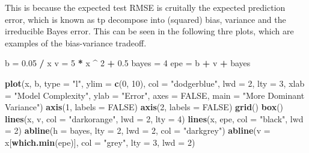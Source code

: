 \documentclass[]{report}
\newenvironment{Shaded}{\begin{snugshade}}{\end{snugshade}}
\newcommand{\KeywordTok}[1]{\textcolor[rgb]{0.13,0.29,0.53}{\textbf{#1}}}
\newcommand{\DataTypeTok}[1]{\textcolor[rgb]{0.13,0.29,0.53}{#1}}
\newcommand{\DecValTok}[1]{\textcolor[rgb]{0.00,0.00,0.81}{#1}}
\newcommand{\FloatTok}[1]{\textcolor[rgb]{0.00,0.00,0.81}{#1}}
\newcommand{\StringTok}[1]{\textcolor[rgb]{0.31,0.60,0.02}{#1}}
\newcommand{\OtherTok}[1]{\textcolor[rgb]{0.56,0.35,0.01}{#1}}
\newcommand{\OperatorTok}[1]{\textcolor[rgb]{0.81,0.36,0.00}{\textbf{#1}}}
\newcommand{\NormalTok}[1]{#1}
\begin{document}
This is because the expected test RMSE is cruitally the expected
prediction error, which is known as tp decompose into (squared) bias,
variance and the irreducible Bayes error. This can be seen in the
following thre plots, which are examples of the bias-variance tradeoff.

\begin{Shaded}
\begin{Highlighting}[]
\NormalTok{b =}\StringTok{ }\FloatTok{0.05} \OperatorTok{/}\StringTok{ }\NormalTok{x}
\NormalTok{v =}\StringTok{ }\DecValTok{5} \OperatorTok{*}\StringTok{ }\NormalTok{x }\OperatorTok{^}\StringTok{ }\DecValTok{2} \OperatorTok{+}\StringTok{ }\FloatTok{0.5}
\NormalTok{bayes =}\StringTok{ }\DecValTok{4}
\NormalTok{epe =}\StringTok{ }\NormalTok{b }\OperatorTok{+}\StringTok{ }\NormalTok{v }\OperatorTok{+}\StringTok{ }\NormalTok{bayes}

\KeywordTok{plot}\NormalTok{(x, b, }\DataTypeTok{type =} \StringTok{"l"}\NormalTok{, }\DataTypeTok{ylim =} \KeywordTok{c}\NormalTok{(}\DecValTok{0}\NormalTok{, }\DecValTok{10}\NormalTok{), }\DataTypeTok{col =} \StringTok{"dodgerblue"}\NormalTok{, }\DataTypeTok{lwd =} \DecValTok{2}\NormalTok{, }\DataTypeTok{lty =} \DecValTok{3}\NormalTok{,}
     \DataTypeTok{xlab =} \StringTok{"Model Complexity"}\NormalTok{, }\DataTypeTok{ylab =} \StringTok{"Error"}\NormalTok{, }\DataTypeTok{axes =} \OtherTok{FALSE}\NormalTok{,}
     \DataTypeTok{main =} \StringTok{"More Dominant Variance"}\NormalTok{)}
\KeywordTok{axis}\NormalTok{(}\DecValTok{1}\NormalTok{, }\DataTypeTok{labels =} \OtherTok{FALSE}\NormalTok{)}
\KeywordTok{axis}\NormalTok{(}\DecValTok{2}\NormalTok{, }\DataTypeTok{labels =} \OtherTok{FALSE}\NormalTok{)}
\KeywordTok{grid}\NormalTok{()}
\KeywordTok{box}\NormalTok{()}
\KeywordTok{lines}\NormalTok{(x, v, }\DataTypeTok{col =} \StringTok{"darkorange"}\NormalTok{, }\DataTypeTok{lwd =} \DecValTok{2}\NormalTok{, }\DataTypeTok{lty =} \DecValTok{4}\NormalTok{)}
\KeywordTok{lines}\NormalTok{(x, epe, }\DataTypeTok{col =} \StringTok{"black"}\NormalTok{, }\DataTypeTok{lwd =} \DecValTok{2}\NormalTok{)}
\KeywordTok{abline}\NormalTok{(}\DataTypeTok{h =}\NormalTok{ bayes, }\DataTypeTok{lty =} \DecValTok{2}\NormalTok{, }\DataTypeTok{lwd =} \DecValTok{2}\NormalTok{, }\DataTypeTok{col =} \StringTok{"darkgrey"}\NormalTok{)}
\KeywordTok{abline}\NormalTok{(}\DataTypeTok{v =}\NormalTok{ x[}\KeywordTok{which.min}\NormalTok{(epe)], }\DataTypeTok{col =} \StringTok{"grey"}\NormalTok{, }\DataTypeTok{lty =} \DecValTok{3}\NormalTok{, }\DataTypeTok{lwd =} \DecValTok{2}\NormalTok{)}
\end{Highlighting}
\end{Shaded}
\end{document}
